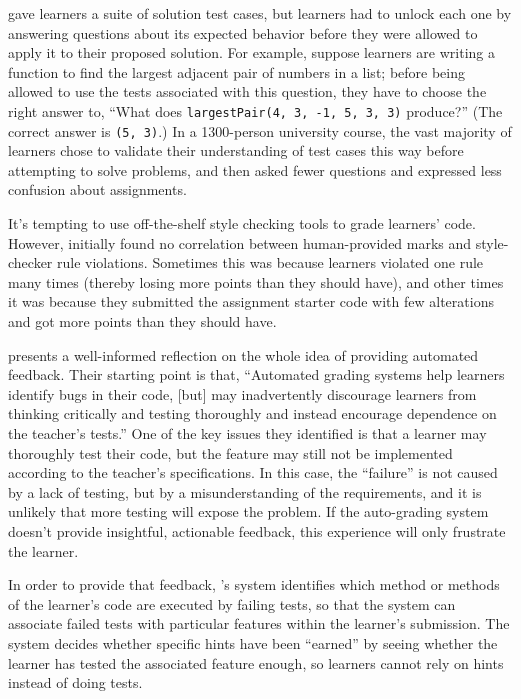 \cite{Basu2015} gave learners a suite of solution test cases, but
learners had to unlock each one by answering questions about its
expected behavior before they were allowed to apply it to their proposed
solution. For example, suppose learners are writing a function to find
the largest adjacent pair of numbers in a list; before being allowed to
use the tests associated with this question, they have to choose the
right answer to, ``What does \texttt{largestPair(4,\ 3,\ -1,\ 5,\ 3,\ 3)} produce?''
(The correct answer is \texttt{(5,\ 3)}.) In a 1300-person university course,
the vast majority of learners chose to validate their understanding of
test cases this way before attempting to solve problems, and then asked
fewer questions and expressed less confusion about assignments.

It's tempting to use off-the-shelf style checking tools to grade
learners' code. However, \cite{Nutb2016} initially found no
correlation between human-provided marks and style-checker rule
violations. Sometimes this was because learners violated one rule many
times (thereby losing more points than they should have), and other
times it was because they submitted the assignment starter code with few
alterations and got more points than they should have.

\cite{Buff2015} presents a well-informed reflection on
the whole idea of providing automated feedback. Their starting point
is that, ``Automated grading systems help learners identify bugs in
their code, {[}but{]} may inadvertently discourage learners from thinking
critically and testing thoroughly and instead encourage dependence on
the teacher's tests.'' One of the key issues they identified is that a
learner may thoroughly test their code, but the feature may still not
be implemented according to the teacher's specifications. In this
case, the ``failure'' is not caused by a lack of testing, but by a
misunderstanding of the requirements, and it is unlikely that more
testing will expose the problem. If the auto-grading system doesn't
provide insightful, actionable feedback, this experience will only
frustrate the learner.

In order to provide that feedback, \cite{Buff2015}'s system
identifies which method or methods of the learner's code are executed by
failing tests, so that the system can associate failed tests with
particular features within the learner's submission. The system decides
whether specific hints have been ``earned'' by seeing whether the learner
has tested the associated feature enough, so learners cannot rely on
hints instead of doing tests.

